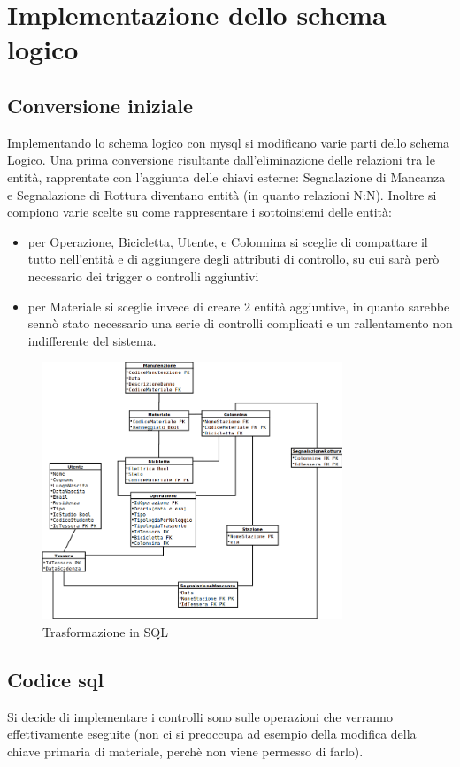 \documentclass[a4paper,twoside]{article}
\begin{document}
\section{Implementazione dello schema logico}
\subsection{Conversione iniziale}
Implementando lo schema logico con mysql si modificano varie parti dello schema Logico.\newline
Una prima conversione risultante dall'eliminazione delle relazioni tra le entità, rapprentate con l'aggiunta delle chiavi esterne: Segnalazione di Mancanza e Segnalazione di Rottura diventano entità (in quanto relazioni N:N).\newline
Inoltre si compiono varie scelte su come rappresentare i sottoinsiemi delle entità:
\begin{itemize}
 \item per Operazione, Bicicletta, Utente, e Colonnina si sceglie di compattare il tutto nell'entità e di aggiungere degli attributi di controllo, su cui sarà però necessario dei trigger o controlli aggiuntivi
 \item per Materiale si sceglie invece di creare 2 entità aggiuntive, in quanto sarebbe sennò stato necessario una serie di controlli complicati e un rallentamento non indifferente del sistema.
\end{itemize}
\begin{figure}[H]
 \centering
  \includegraphics[width=0.8\textwidth]{SQL}
\caption{Trasformazione in SQL}
\end{figure}
\subsection{Codice sql}
Si decide di implementare i controlli sono sulle operazioni che verranno effettivamente eseguite (non ci si preoccupa ad esempio della modifica della chiave primaria di materiale, perchè non viene permesso di farlo).\newline
\end{document}
